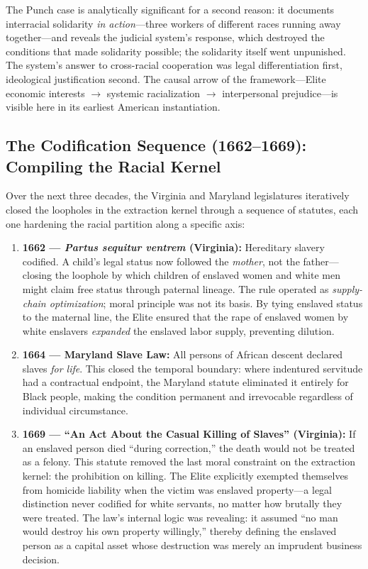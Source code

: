 The Punch case is analytically significant for a second reason: it documents interracial solidarity \textit{in action}---three workers of different races running away together---and reveals the judicial system's response, which destroyed the conditions that made solidarity possible; the solidarity itself went unpunished. The system's answer to cross-racial cooperation was legal differentiation first, ideological justification second. The causal arrow of the framework---Elite economic interests $\rightarrow$ systemic racialization $\rightarrow$ interpersonal prejudice---is visible here in its earliest American instantiation.

\subsection{The Codification Sequence (1662--1669): Compiling the Racial Kernel}

Over the next three decades, the Virginia and Maryland legislatures iteratively closed the loopholes in the extraction kernel through a sequence of statutes, each one hardening the racial partition along a specific axis:

\begin{enumerate}
    \item \textbf{1662 --- \textit{Partus sequitur ventrem} (Virginia):} Hereditary slavery codified. A child's legal status now followed the \textit{mother}, not the father---closing the loophole by which children of enslaved women and white men might claim free status through paternal lineage. The rule operated as \textit{supply-chain optimization}; moral principle was not its basis. By tying enslaved status to the maternal line, the Elite ensured that the rape of enslaved women by white enslavers \textit{expanded} the enslaved labor supply, preventing dilution.

    \item \textbf{1664 --- Maryland Slave Law:} All persons of African descent declared slaves \textit{for life}. This closed the temporal boundary: where indentured servitude had a contractual endpoint, the Maryland statute eliminated it entirely for Black people, making the condition permanent and irrevocable regardless of individual circumstance.

    \item \textbf{1669 --- ``An Act About the Casual Killing of Slaves'' (Virginia):} If an enslaved person died ``during correction,'' the death would not be treated as a felony. This statute removed the last moral constraint on the extraction kernel: the prohibition on killing. The Elite explicitly exempted themselves from homicide liability when the victim was enslaved property---a legal distinction never codified for white servants, no matter how brutally they were treated. The law's internal logic was revealing: it assumed ``no man would destroy his own property willingly,'' thereby defining the enslaved person as a capital asset whose destruction was merely an imprudent business decision.
\end{enumerate}

